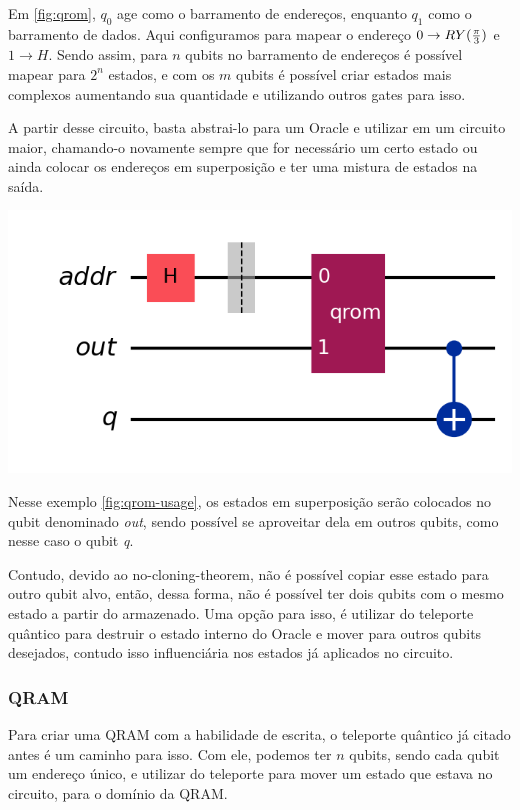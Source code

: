 \documentclass{article}
\begin{document}
Em \ref{fig:qrom}, $q_{0}$ age como o barramento de endereços, enquanto $q_{1}$ como o barramento de dados. Aqui configuramos para mapear o endereço $0 \to RY({\pi\over{3}})$ e $1 \to H$. Sendo assim, para $n$ qubits no barramento de endereços é possível mapear para $2^{n}$ estados, e com os $m$ qubits é possível criar estados mais complexos aumentando sua quantidade e utilizando outros gates para isso.

A partir desse circuito, basta abstrai-lo para um Oracle e utilizar em um circuito maior, chamando-o novamente sempre que for necessário um certo estado ou ainda colocar os endereços em superposição e ter uma mistura de estados na saída.

\begin{center}
	\includegraphics[scale=0.5]{qrom_1_usage.png}
	\label{fig:qrom-usage}
\end{center}

Nesse exemplo \ref{fig:qrom-usage}, os estados em superposição serão colocados no qubit denominado \emph{out}, sendo possível se aproveitar dela em outros qubits, como nesse caso o qubit \emph{q}.

Contudo, devido ao no-cloning-theorem, não é possível copiar esse estado para outro qubit alvo, então, dessa forma, não é possível ter dois qubits com o mesmo estado a partir do armazenado. Uma opção para isso, é utilizar do teleporte quântico para destruir o estado interno do Oracle e mover para outros qubits desejados, contudo isso influenciária nos estados já aplicados no circuito.


\subsubsection{QRAM}

Para criar uma QRAM com a habilidade de escrita, o teleporte quântico já citado antes é um caminho para isso. Com ele, podemos ter $n$ qubits, sendo cada qubit um endereço único, e utilizar do teleporte para mover um estado que estava no circuito, para o domínio da QRAM.
\end{document}
